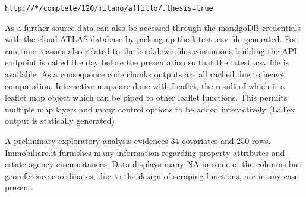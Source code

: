 \documentclass[
  12pt,
  a4paper,
  oneside]{book}
\begin{document}
\texttt{http://*/complete/120/milano/affitto/.thesis=true}

As a further source data can also be accessed through the mondgoDB credentials with the cloud ATLAS database by picking up the latest .csv file generated. For run time reasons also related to the bookdown files continuous building the API endpoint is called the day before the presentation so that the latest .csv file is available. As a consequence code chunks outputs are all cached due to heavy computation.
Interactive maps are done with Leaflet, the result of which is a leaflet map object which can be piped to other leaflet functions. This permits multiple map layers and many control options to be added interactively (LaTex output is statically generated)

A preliminary exploratory analysis evidences 34 covariates and 250 rows. Immobiliare.it furnishes many information regarding property attributes and estate agency circumstances. Data displays many NA in some of the columns but georeference coordinates, due to the design of scraping functions, are in any case present.

\begingroup\fontsize{8}{10}\selectfont
\end{document}
